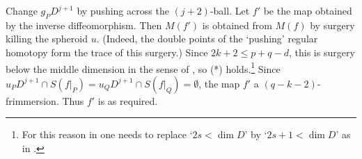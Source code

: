 \documentclass[12pt]{article}
\newcommand{\aronly}[1]{#1}
\theoremstyle{plain}
\theoremstyle{definition}
\begin{document}
Change $g_PD^{j+1}$
by pushing across the $(j+2)$-ball.
Let $f'$ be the map obtained by the inverse diffeomorphism.
Then $M(f')$ is obtained from $M(f)$ by surgery killing the spheroid $u$.
(Indeed, the double points of the `pushing' regular homotopy form the trace of this surgery.)
Since $2k+2\le p+q-d$, this is surgery below the middle dimension in the sense of \cite{Mi61}, so (*) holds.\aronly{\footnote{For this reason in \cite[Appendix A]{HK98} one needs to replace `$2s<\dim D$' by `$2s+1<\dim D$' as in  \cite[Appendix, (ii)]{CRS}.}}
Since $u_PD^{j+1}\cap S(f|_P)=u_QD^{j+1}\cap S(f|_Q)=\emptyset$, the map $f'$ a $(q-k-2)$-frimmersion.
Thus $f'$ is as required.



\end{document}
